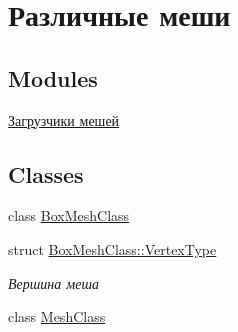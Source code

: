 \hypertarget{group___meshes}{}\section{Различные меши}
\label{group___meshes}
\subsection*{Modules}
\begin{DoxyCompactItemize}
\item 
\hyperlink{group___loaders}{Загрузчики мешей}
\end{DoxyCompactItemize}
\subsection*{Classes}
\begin{DoxyCompactItemize}
\item 
class \hyperlink{class_box_mesh_class}{Box\+Mesh\+Class}
\item 
struct \hyperlink{struct_box_mesh_class_1_1_vertex_type}{Box\+Mesh\+Class\+::\+Vertex\+Type}
\begin{DoxyCompactList}\small\item\em Вершина меша \end{DoxyCompactList}\item 
class \hyperlink{class_mesh_class}{Mesh\+Class}
\end{DoxyCompactItemize}
